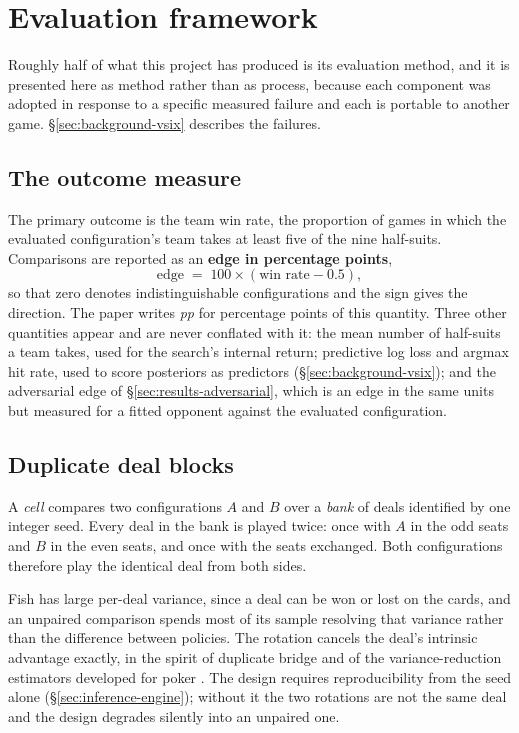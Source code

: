 \section{Evaluation framework}
\label{sec:evaluation}

Roughly half of what this project has produced is its evaluation method, and it is presented here as
method rather than as process, because each component was adopted in response to a specific measured
failure and each is portable to another game. \S\ref{sec:background-vsix} describes the failures.

\subsection{The outcome measure}
\label{sec:evaluation-measure}

The primary outcome is the team win rate, the proportion of games in which the evaluated
configuration's team takes at least five of the nine half-suits. Comparisons are reported as an
\textbf{edge in percentage points},
\[
  \text{edge} \;=\; 100 \times (\text{win rate} - 0.5),
\]
so that zero denotes indistinguishable configurations and the sign gives the direction. The paper
writes \emph{pp} for percentage points of this quantity. Three other quantities appear and are never
conflated with it: the mean number of half-suits a team takes, used for the search's internal return;
predictive log loss and argmax hit rate, used to score posteriors as predictors
(\S\ref{sec:background-vsix}); and the adversarial edge of \S\ref{sec:results-adversarial}, which is
an edge in the same units but measured for a fitted opponent against the evaluated configuration.

\subsection{Duplicate deal blocks}
\label{sec:evaluation-duplicate}

A \emph{cell} compares two configurations $A$ and $B$ over a \emph{bank} of deals identified by one
integer seed. Every deal in the bank is played twice: once with $A$ in the odd seats and $B$ in the
even seats, and once with the seats exchanged. Both configurations therefore play the identical deal
from both sides.

Fish has large per-deal variance, since a deal can be won or lost on the cards, and an unpaired
comparison spends most of its sample resolving that variance rather than the difference between
policies. The rotation cancels the deal's intrinsic advantage exactly, in the spirit of duplicate
bridge and of the variance-reduction estimators developed for poker
\cite{zinkevich-divat,burch-aivat}. The design requires reproducibility from the seed alone
(\S\ref{sec:inference-engine}); without it the two rotations are not the same deal and the design
degrades silently into an unpaired one.

